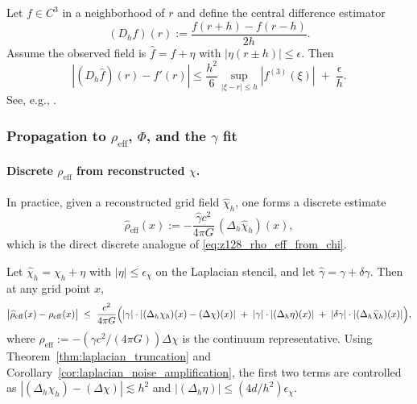 \begin{proposition}\label{prop:derivative_error_tradeoff}
Let $f\in C^3$ in a neighborhood of $r$ and define the central difference estimator
\[
(D_h f)(r):=\frac{f(r+h)-f(r-h)}{2h}.
\]
Assume the observed field is $\widehat f=f+\eta$ with $|\eta(r\pm h)|\le \epsilon$.
Then
\[
|(D_h\widehat f)(r)-f'(r)|
\le
\frac{h^2}{6}\sup_{|\xi-r|\le h}|f^{(3)}(\xi)|
\;+\;\frac{\epsilon}{h}.
\]
See, e.g., \cite{LeVeque2007FDM}.
\end{proposition}

\subsubsection{Propagation to \texorpdfstring{$\rho_{\mathrm{eff}}$}{rho\_eff}, \texorpdfstring{$\Phi$}{Phi}, and the \texorpdfstring{$\gamma$}{gamma} fit}
\label{subsec:prot_to_cont_propagation_to_gravity}

\paragraph{Discrete \texorpdfstring{$\rho_{\mathrm{eff}}$}{rho\_eff} from reconstructed \texorpdfstring{$\chi$}{chi}.}
\InterfaceTag In practice, given a reconstructed grid field $\widehat\chi_h$, one forms a discrete estimate
\[
\widehat\rho_{\mathrm{eff}}(x)
:= -\frac{\widehat\gamma c^2}{4\pi G}\,(\Delta_h\widehat\chi_h)(x),
\]
which is the direct discrete analogue of \eqref{eq:z128_rho_eff_from_chi}.

\begin{corollary}\label{cor:rho_eff_error_budget}
Let $\widehat\chi_h=\chi_h+\eta$ with $|\eta|\le \epsilon_\chi$ on the Laplacian stencil, and let $\widehat\gamma=\gamma+\delta\gamma$.
Then at any grid point $x$,
\[
\bigl|\widehat\rho_{\mathrm{eff}}(x)-\rho_{\mathrm{eff}}(x)\bigr|
\;\le\;
\frac{c^2}{4\pi G}\Bigl(
|\gamma|\cdot |(\Delta_h\chi_h)(x)-(\Delta\chi)(x)|
\;+\;|\gamma|\cdot |(\Delta_h\eta)(x)|
\;+\;|\delta\gamma|\cdot |(\Delta_h\widehat\chi_h)(x)|
\Bigr),
\]
where $\rho_{\mathrm{eff}}:=-(\gamma c^2/(4\pi G))\Delta\chi$ is the continuum representative.
Using Theorem~\ref{thm:laplacian_truncation} and Corollary~\ref{cor:laplacian_noise_amplification}, the first two terms are controlled as
$|(\Delta_h\chi_h)-(\Delta\chi)|\lesssim h^2$ and $|(\Delta_h\eta)|\le (4d/h^2)\epsilon_\chi$.
\end{corollary}

